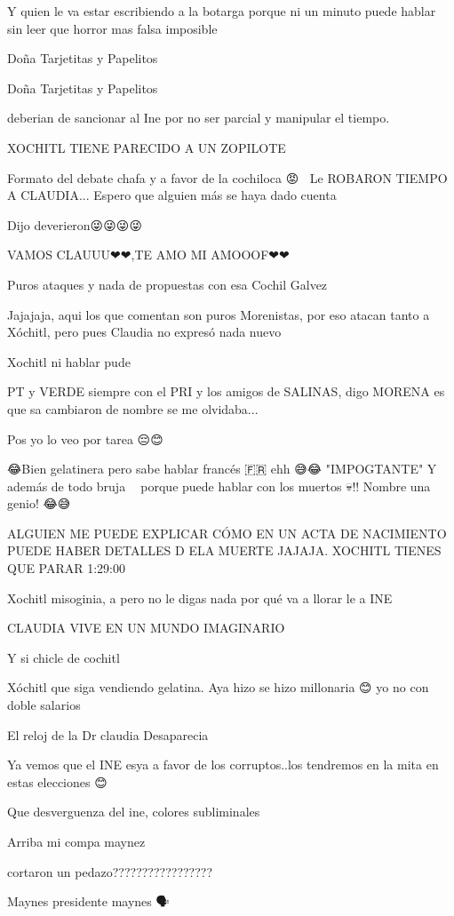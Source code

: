 Y quien le va estar escribiendo a la botarga porque ni un minuto puede hablar sin leer que horror mas falsa imposible

Doña Tarjetitas y Papelitos

Doña Tarjetitas y Papelitos

deberian de sancionar al Ine por no ser parcial y manipular el tiempo.

XOCHITL TIENE PARECIDO A UN ZOPILOTE

Formato del debate chafa y a favor de la cochiloca 😡🤬🤮
Le ROBARON TIEMPO A CLAUDIA... Espero que alguien más se haya dado cuenta 🤔

Dijo deverieron😜😜😜😜

VAMOS CLAUUU❤❤,TE AMO MI AMOOOF❤❤

Puros ataques y nada de propuestas con esa Cochil Galvez

Jajajaja, aqui los que comentan son puros Morenistas, por eso atacan tanto a Xóchitl, pero pues Claudia no expresó nada nuevo

Xochitl ni hablar pude

PT y VERDE siempre con el PRI y los amigos de SALINAS, digo MORENA es que sa cambiaron de nombre se me olvidaba...

Pos yo lo veo por tarea 😔😊

😂Bien gelatinera pero sabe hablar francés 🇫🇷 ehh 😅😂
"IMPOGTANTE"
Y además de todo bruja 🧙‍♀️ porque puede hablar con los muertos 💀!!
Nombre una genio! 😂😅

ALGUIEN ME PUEDE EXPLICAR CÓMO EN UN ACTA DE NACIMIENTO PUEDE HABER DETALLES D ELA MUERTE JAJAJA. XOCHITL TIENES QUE PARAR 1:29:00

Xochitl misoginia, a pero no le digas nada por qué va a llorar le a INE

CLAUDIA VIVE EN UN MUNDO IMAGINARIO

Y si chicle de cochitl

Xóchitl que siga vendiendo gelatina.
Aya hizo se hizo millonaria 😊 yo no con doble salarios

El reloj de la Dr claudia Desaparecia

Ya vemos que el INE esya a favor de los corruptos..los tendremos en la mita en estas elecciones 😊

Que desverguenza del ine, colores subliminales

Arriba mi compa maynez

cortaron un pedazo?????????????????

Maynes presidente maynes 🗣️

